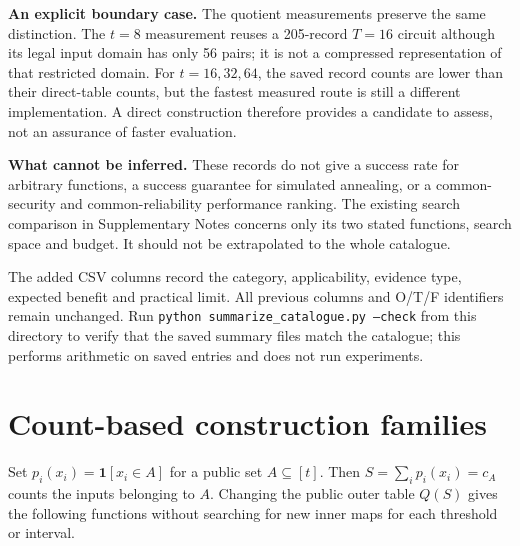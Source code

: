 \documentclass[a4paper,10pt]{article}
\newif\ifappmarked
\newcommand{\appadd}[1]{\ifappmarked{\color{blue}#1}\else#1\fi}
\newcommand{\ind}{\mathbf{1}}
\begin{document}
\appadd{\textbf{An explicit boundary case.} The quotient measurements preserve the same distinction. The $t=8$ measurement reuses a 205-record $T=16$ circuit although its legal input domain has only 56 pairs; it is not a compressed representation of that restricted domain. For $t=16,32,64$, the saved record counts are lower than their direct-table counts, but the fastest measured route is still a different implementation. A direct construction therefore provides a candidate to assess, not an assurance of faster evaluation.}

\appadd{\textbf{What cannot be inferred.} These records do not give a success rate for arbitrary functions, a success guarantee for simulated annealing, or a common-security and common-reliability performance ranking. The existing search comparison in Supplementary Notes concerns only its two stated functions, search space and budget. It should not be extrapolated to the whole catalogue.}

\appadd{The added CSV columns record the category, applicability, evidence type, expected benefit and practical limit. All previous columns and O/T/F identifiers remain unchanged. Run \texttt{python summarize\_catalogue.py --check} from this directory to verify that the saved summary files match the catalogue; this performs arithmetic on saved entries and does not run experiments.}

\newpage
\section{Count-based construction families}
Set $p_i(x_i)=\ind[x_i\in A]$ for a public set $A\subseteq[t]$. Then $S=\sum_i p_i(x_i)=c_A$ counts the inputs belonging to $A$. Changing the public outer table $Q(S)$ gives the following functions without searching for new inner maps for each threshold or interval.
\end{document}
